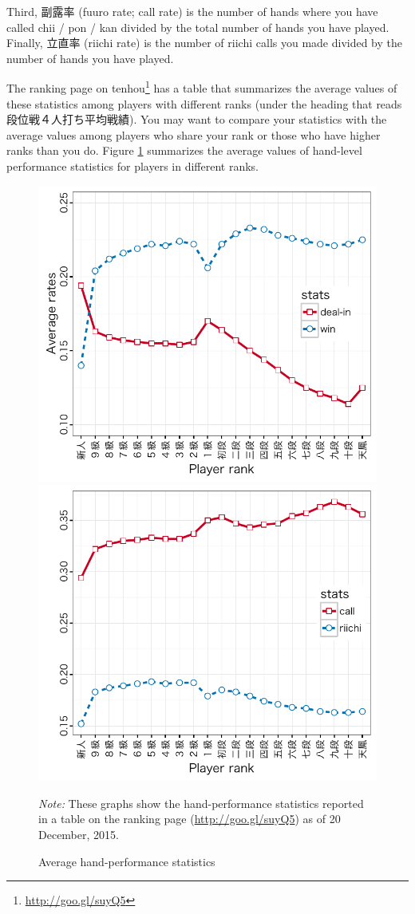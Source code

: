 \bigskip
Third, 副露率 ({\jap fuuro} rate; call rate) is the number of hands where you have called {\jap chii} / {\jap pon} / {\jap kan} divided by the total number of hands you have played. Finally, 立直率 ({\jap riichi} rate) is the number of {\jap riichi} calls you made divided by the number of hands you have played. 

\bigskip

The ranking page on {\jap tenhou}\footnote{\url{http://goo.gl/suyQ5}} has a table that summarizes the average values of these statistics among players with different ranks (under the heading that reads 段位戦４人打ち平均戦績). You may want to compare your statistics with the average values among players who share your rank or those who have higher ranks than you do. Figure \ref{fig:avg} summarizes the average values of hand-level performance statistics for players in different ranks. 

\begin{figure}[t!] \captionsetup{font=small}
\begin{center}
\includegraphics[width=.50\textwidth,clip]{figs/stats_wd.pdf}\hspace{-7pt}
\includegraphics[width=.50\textwidth,clip]{figs/stats_cr.pdf}
\vspace{-10pt}
\caption{Average hand-performance statistics}\label{fig:avg}
\end{center}\vspace{-10pt}
{\footnotesize \textit{Note:} These graphs show the hand-performance statistics reported in a table on the ranking page (\url{http://goo.gl/suyQ5}) as of 20 December, 2015.}
\end{figure}

